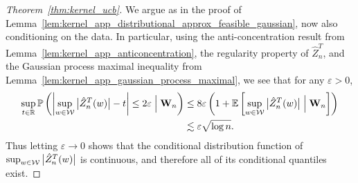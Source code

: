 \begin{proof}[Theorem~\ref{thm:kernel_ucb}]


  We argue as in the proof of
  Lemma~\ref{lem:kernel_app_distributional_approx_feasible_gaussian},
  now also conditioning on the data.
  In particular, using the anti-concentration result from
  Lemma~\ref{lem:kernel_app_anticoncentration},
  the regularity property of $\hat Z_n^T$,
  and the Gaussian process maximal inequality from
  Lemma~\ref{lem:kernel_app_gaussian_process_maximal},
  we see that for any $\varepsilon > 0$,
  \begin{align*}
    \sup_{t \in \mathbb{R}}
    \mathbb{P}\left(
      \left|
      \sup_{w \in \mathcal{W}}
      \big| \hat Z_n^T(w) \big|
      - t
      \right|
      \leq 2\varepsilon
      \Bigm\vert \mathbf{W}_n
    \right)
    &\leq
    8 \varepsilon
    \left(
      1 + \mathbb{E}\left[
        \sup_{w \in \mathcal{W}}
        \big| \hat Z_n^T(w) \big|
        \Bigm\vert \mathbf{W}_n
      \right]
    \right) \\
    &\lesssim \varepsilon \sqrt{\log n}.
  \end{align*}
  Thus letting $\varepsilon \to 0$
  shows that the conditional distribution function of
  $\sup_{w \in \mathcal{W}} \big|\hat Z_n^T(w)\big|$
  is continuous,
  and therefore all of its conditional quantiles exist.



\end{proof}
